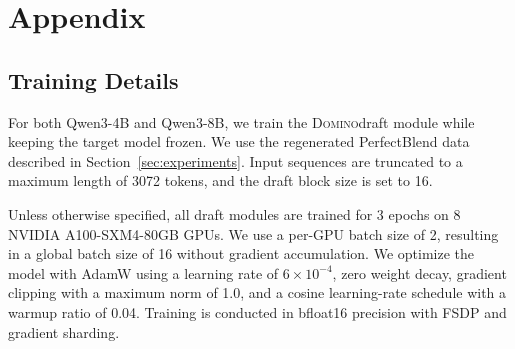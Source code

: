 \documentclass{llmxive}
\providecommand{\method}{\textsc{Domino}}
\begin{document}
%



\appendix

\section{Appendix}
\label{sec:appendix}
\subsection{Training Details}
\label{app:training_details}

For both Qwen3-4B and Qwen3-8B, we train the \method draft module while keeping the target model frozen. We use the regenerated PerfectBlend data described in Section~\ref{sec:experiments}. Input sequences are truncated to a maximum length of 3072 tokens, and the draft block size is set to 16.

Unless otherwise specified, all draft modules are trained for 3 epochs on 8 NVIDIA A100-SXM4-80GB GPUs. We use a per-GPU batch size of 2, resulting in a global batch size of 16 without gradient accumulation. We optimize the model with AdamW using a learning rate of \(6\times 10^{-4}\), zero weight decay, gradient clipping with a maximum norm of 1.0, and a cosine learning-rate schedule with a warmup ratio of 0.04. Training is conducted in bfloat16 precision with FSDP and gradient sharding.

\begin{table}[!htbp]
\centering
{}
\caption{Baseline draft model checkpoints used in our experiments.}
\label{tab:baseline_checkpoints}
\end{table}
\end{document}
